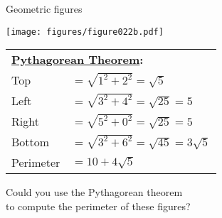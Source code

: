 \documentclass[14pt]{beamer}
\begin{document}

    \begin{frame}{Geometric figures}
        \begin{center}
            \begin{minipage}{0.5\textwidth}%
                \centering \texttt{[image: figures/figure022b.pdf]}
            \end{minipage}\hfill\begin{minipage}{0.49\textwidth} \footnotesize

                \hspace{-0.5em}\begin{tabular}{ll}
                    \multicolumn{2}{l}{\small \textbf{\href{https://en.wikipedia.org/wiki/Pythagorean_theorem}{Pythagorean Theorem}:}}           \\[4ex]
                    Top       & $\!\!\!\!\!= \sqrt{1^2 + 2^2} = \sqrt{5}$              \\[1.5ex]
                    Left      & $\!\!\!\!\!= \sqrt{3^2 + 4^2} = \sqrt{25} = 5$         \\[1.5ex]
                    Right     & $\!\!\!\!\!= \sqrt{5^2 + 0^2} = \sqrt{25} = 5$         \\[1.5ex]
                    Bottom    & $\!\!\!\!\!= \sqrt{3^2 + 6^2} = \sqrt{45} = 3\sqrt{5}$ \\[4ex]
                    Perimeter & $\!\!\!\!\!= 10 + 4\sqrt{5}$
                \end{tabular}
            \end{minipage}

            \bigskip \bigskip

            Could you use the Pythagorean theorem\\to compute the perimeter of these figures?
        \end{center}

    \end{frame}

\end{document}

